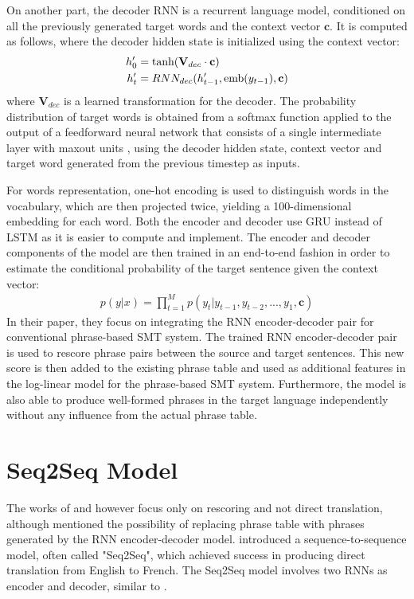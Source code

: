 \documentclass[12pt]{extarticle}
\begin{document}
On another part, the decoder RNN is a recurrent language model, conditioned on all the previously generated target words and the context vector $\textbf{c}$. It is computed as follows, where the decoder hidden state is initialized using the context vector:
\begin{align} 
h'_{0} &= \textnormal{tanh}(\textbf{V}_{dec} \cdot \textbf{c}) \\
h'_{t} &= RNN_{dec}(h'_{t-1}, \textnormal{emb}(y_{t-1}), \textbf{c}) 
\label{eq:18}
\end{align}
where $\textbf{V}_{dec}$ is a learned transformation for the decoder. The probability distribution of target words is obtained from a softmax function applied to the output of a feedforward neural network that consists of a single intermediate layer with maxout units \citep{Goodfellow:2013:MN:3042817.3043084}, using the decoder hidden state, context vector and target word generated from the previous timestep as inputs.

For words representation, one-hot encoding is used to distinguish words in the vocabulary, which are then projected twice, yielding a 100-dimensional embedding for each word.
Both the encoder and decoder use GRU instead of LSTM as it is easier to compute and implement. The encoder and decoder components of the model are then trained in an end-to-end fashion in order to estimate the conditional probability of the target sentence given the context vector: 
\begin{align}
p(y|x) = \prod_{t=1}^{M} p(y_{t} | y_{t-1}, y_{t-2},...,y_{1}, \textbf{c}) \label{eq:19}
\end{align}
In their paper, they focus on integrating the RNN encoder-decoder pair for conventional phrase-based SMT system. The trained RNN encoder-decoder pair is used to rescore phrase pairs between the source and target sentences. This new score is then added to the existing phrase table and used as additional features in the log-linear model for the phrase-based SMT system. Furthermore, the model is also able to produce well-formed phrases in the target language independently without any influence from the actual phrase table.


\section*{Seq2Seq Model}
The works of \citep{kalchbrenner-blunsom-2013-recurrent-continuous} and \citep{cho-etal-2014-learning} however focus only on rescoring and not direct translation, although \citep{cho-etal-2014-learning} mentioned the possibility of replacing phrase table with phrases generated by the RNN encoder-decoder model. \citep{Sutskever:2014:SSL:2969033.2969173} introduced a sequence-to-sequence model, often called "Seq2Seq", which achieved success in producing direct translation from English to French. The Seq2Seq model involves two RNNs as encoder and decoder, similar to \citep{cho-etal-2014-learning}.
\end{document}
